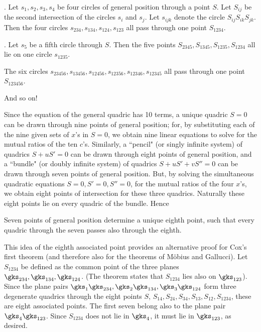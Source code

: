 .  Let $s_1,s_2,s_3,s_4$ be four circles of general position through a point $S$.  Let $S_{ij}$ be the second intersection of the circles $s_i$ and $s_j$.  Let $s_{ijk}$ denote the circle $S_{ij}S_{ik}S_{jk}$.  Then the four circles $s_{234},s_{134},s_{124},s_{123}$ all pass through one point $S_{1234}$. \endproclaim

.  Let $s_5$ be a fifth circle through $S$.  Then the five points $S_{2345},S_{1345},S_{1235},S_{1234}$ all lie on one circle $s_{1235}$. \endproclaim

 The six circles $s_{23456},s_{13456},s_{12456},s_{12356},s_{12346},s_{12345}$ all pass through one point $S_{123456}$. \endproclaim

And so on!

Since the equation of the general quadric has 10 terms, a unique quadric $S=0$ can be drawn through nine points of general position; for, by substituting each of the nine given sets of $x$'s in $S=0$, we obtain nine linear equations to solve for the mutual ratios of the ten $c$'s.  Similarly, a ``pencil" (or singly infinite system) of quadrics $S+uS'=0$ can be drawn through eight points of general position, and a ``bundle" (or doubly infinite system) of quadrics $S+uS'+vS''=0$ can be drawn through seven points of general position.  But, by solving the simultaneous quadratic equations $S=0, S'=0, S''=0$, for the mutual ratios of the four $x$'s, we obtain eight points of intersection for these three quadrics.  Naturally these eight points lie on every quadric of the bundle.  Hence 

Seven points of general position determine a unique eighth point, such that every quadric through the seven passes also through the eighth.

This idea of the eighth associated point provides an alternative proof for Cox's first theorem (and therefore also for the theorems of M\"obius and Gallucci).  Let $S_{1234}$ be defined as the common point of the three planes $\gks_{234},\gks_{134},\gks_{124}$.  (The theorem states that $S_{1234}$ lies also on $\gks_{123}$).  Since the plane pairs $\gks_1\gks_{234},\gks_2\gks_{134},\gks_3\gks_{124}$ form three degenerate quadrics through the eight points $S$, $S_{14}, S_{24}, S_{34}, S_{13}, S_{12}, S_{1234}$, these are eight associated points.  The first seven belong also to the plane pair $\gks_4\gks_{123}$.  Since $S_{1234}$ does not lie in $\gks_4$, it must lie in $\gks_{123}$, as desired.

